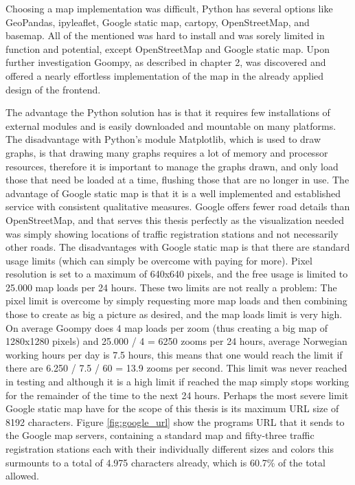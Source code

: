 Choosing a map implementation was difficult, Python has several options like GeoPandas, ipyleaflet, Google static map, cartopy, OpenStreetMap, and basemap. All of the mentioned was hard to install and was sorely limited in function and potential, except OpenStreetMap and Google static map. Upon further investigation Goompy, as described in chapter 2, was discovered and offered a nearly effortless implementation of the map in the already applied design of the frontend.

The advantage the Python solution has is that it requires few installations of external modules and is easily downloaded and mountable on many platforms.
The disadvantage with Python's module Matplotlib, which is used to draw graphs, is that drawing many graphs requires a lot of memory and processor resources, therefore it is important to manage the graphs drawn, and only load those that need be loaded at a time, flushing those that are no longer in use.
The advantage of Google static map is that it is a well implemented and established service with consistent qualitative measures. Google offers fewer road details than OpenStreetMap, and that serves this thesis perfectly as the visualization needed was simply showing locations of traffic registration stations and not necessarily other roads.
The disadvantages with Google static map is that there are standard usage limits (which can simply be overcome with paying for more). Pixel resolution is set to a maximum of 640x640 pixels, and the free usage is limited to 25.000 map loads per 24 hours. These two limits are not really a problem: The pixel limit is overcome by simply requesting more map loads and then combining those to create as big a picture as desired, and the map loads limit is very high. On average Goompy does 4 map loads per zoom (thus creating a big map of 1280x1280 pixels) and 25.000 / 4 = 6250 zooms per 24 hours, average Norwegian working hours per day is 7.5 hours, this means that one would reach the limit if there are 6.250 / 7.5 / 60 = 13.9 zooms per second. This limit was never reached in testing and although it is a high limit if reached the map simply stops working for the remainder of the time to the next 24 hours. Perhaps the most severe limit Google static map have for the scope of this thesis is its maximum URL size of 8192 characters. Figure \ref{fig:google_url} show the programs URL that it sends to the Google map servers, containing a standard map and fifty-three traffic registration stations each with their individually different sizes and colors this surmounts to a total of 4.975 characters already, which is 60.7\% of the total allowed. 

